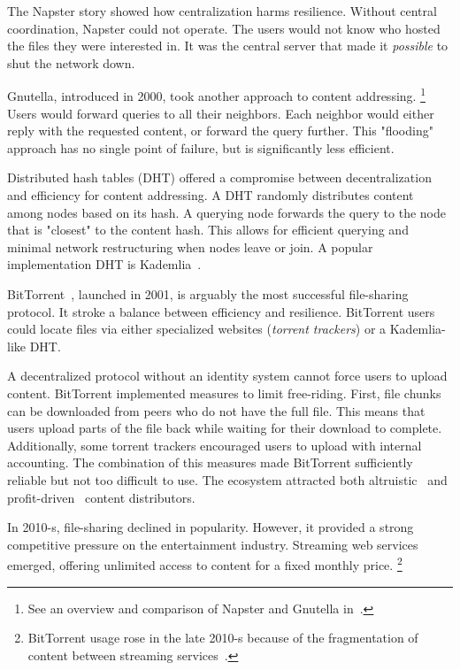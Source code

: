 The Napster story showed how centralization harms resilience.
Without central coordination, Napster could not operate.
The users would not know who hosted the files they were interested in.
It was the central server that made it \textit{possible} to shut the network down.

Gnutella, introduced in 2000, took another approach to content addressing.
\footnote{See an overview and comparison of Napster and Gnutella in~\cite{Saroiu2003}.}
Users would forward queries to all their neighbors.
Each neighbor would either reply with the requested content, or forward the query further.
This "flooding" approach has no single point of failure, but is significantly less efficient.

Distributed hash tables (DHT) offered a compromise between decentralization and efficiency for content addressing.
A DHT randomly distributes content among nodes based on its hash.
A querying node forwards the query to the node that is "closest" to the content hash.
This allows for efficient querying and minimal network restructuring when nodes leave or join.
A popular implementation DHT is Kademlia~\cite{Maymounkov2002}.

BitTorrent~\cite{Pouwelse2005}, launched in 2001, is arguably the most successful file-sharing protocol.
It stroke a balance between efficiency and resilience.
BitTorrent users could locate files via either specialized websites (\textit{torrent trackers}) or a Kademlia-like DHT.

A decentralized protocol without an identity system cannot force users to upload content.
BitTorrent implemented measures to limit free-riding.
First, file chunks can be downloaded from peers who do not have the full file.
This means that users upload parts of the file back while waiting for their download to complete.
Additionally, some torrent trackers encouraged users to upload with internal accounting.
The combination of this measures made BitTorrent sufficiently reliable but not too difficult to use.
The ecosystem attracted both altruistic~\cite{Rehn2004} and profit-driven~\cite{Rumin2010} content distributors.

In 2010-s, file-sharing declined in popularity.
However, it provided a strong competitive pressure on the entertainment industry.
Streaming web services emerged, offering unlimited access to content for a fixed monthly price.
\footnote{BitTorrent usage rose in the late 2010-s because of the fragmentation of content between streaming services~\cite{Bode2018}.}

